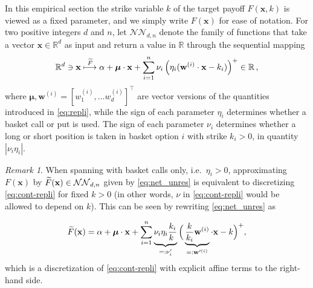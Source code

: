 \documentclass[11pt,A4,twoside]{article}
\numberwithin{equation}{section}
\renewcommand{\vec}{\mathbf}
\newcommand{\norm}[1]{\left|#1 \right|}
\newcommand{\x}{\mathbf{x}}
\newcommand{\w}{\mathbf{w}}
\newcommand{\R}{\mathbbm{R}}
\newcommand{\nn}{\mathcal{NN}}
\newcommand{\beqa}{\begin{eqnarray}}
\newcommand{\eeqa}{\end{eqnarray}}
\def\bal{\begin{aligned}}
\def\eal{\end{aligned}}
\def\bll#1{
\beqa\label{#1}\bal
}\def\lel{\eal\eeqa}
\newcommand{\beql}[1]{\bll{#1}}
\newcommand{\eeql}{\lel}
\theoremstyle{definition}
\theoremstyle{remark}
\newtheorem{remark}{Remark}[section]
\def\R{\mathbb{R}}
\def\cdots{\dots}
\def\then{l}\def\then{n}%
\begin{document}



In this empirical section the strike variable $k$ of the target payoff $F(\x,k)$ is viewed as a fixed parameter, and we simply write $F(\x)$ for ease of notation.
For two positive integers $d$ and $\then$, let $\nn_{d,\then }$ denote the family of functions that take a vector $\x \in \R^d$ as input and return a value in $\R$ through the sequential mapping
\begin{align}\label{eq:net_unres}
\R^d \ni \x \stackrel{\theNN}{\longmapsto } \alpha + \boldsymbol \mu \cdot \x + \sum_{i=1}^{\then} \nu_i \left(\eta_i(\vec w^{(i)}\cdot \vec x - k_i)\right)^+   \in \R \,
    ,
\end{align}
where $\boldsymbol\mu, \vec w^{(i)} = [w^{(i)}_1,\cdots w^{(i)}_d]^\top $ are vector versions of the quantities introduced in \eqref{eq:repli}, while the sign of each parameter $\eta_i$ determines whether a basket call or put is used.  The sign of each parameter $\nu_i$ determines whether a long or short position is taken in basket option $i$ with strike $k_i>0$, in quantity $ \norm{ \nu_i \eta_i} $.

\begin{remark} When spanning with basket calls only, i.e.~$\eta_i>0$, approximating $F(\vec x)$ by $\theNN(\x) \in \nn_{d,\then }$ given by \eqref{eq:net_unres} is equivalent to discretizing \eqref{eq:cont-repli} for fixed $k>0$ (in other words, $\nu$ in \eqref{eq:cont-repli} would be allowed to depend on $k$). This can be seen by rewriting \eqref{eq:net_unres} as
\beql{e:changek}
          \theNN(\x) = \alpha + \boldsymbol \mu \cdot \x + \sum_{i=1}^{\then} \underbrace{\nu_i \eta_i\frac{k_i}{k_{\phantom i}}}_{=:\nu_i'}\Big(\underbrace{\frac{k}{k_i}\vec w^{(i)}}_{=:\w'^{(i)}}\cdot \vec x - k\Big)^+,
\eeql
which is a discretization of \eqref{eq:cont-repli} with explicit affine terms to the right-hand side.
\end{remark}
\end{document}
